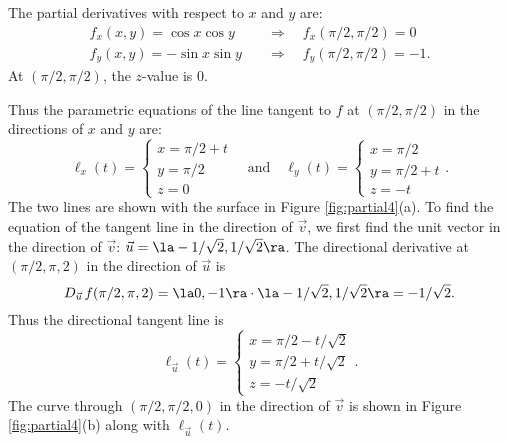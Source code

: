 \clearpage

{The partial derivatives with respect to $x$ and $y$ are:
\begin{align*}
f_x(x,y) = \cos x\cos y\quad &\Rightarrow \quad f_x(\pi/2,\pi/2) = 0\\
f_y(x,y) = -\sin x\sin y\quad&\Rightarrow \quad f_y(\pi/2,\pi/2)=-1.
\end{align*}
At $(\pi/2,\pi/2)$, the $z$-value is 0.

Thus the parametric equations of the line tangent to $f$ at $(\pi/2,\pi/2)$ in the directions of $x$  and $y$ are:
$$\ell_x(t) = \left\{\begin{array}{l} x=\pi/2 + t\\ y=\pi/2 \\z=0 \end{array}\right. \quad \text{and}\quad 
\ell_y(t) = \left\{\begin{array}{l} x=\pi/2 \\ y=\pi/2+t \\z=-t \end{array}\right..$$
The two lines are shown with the surface in Figure \ref{fig:partial4}(a).
To find the equation of the tangent line in the direction of $\vec v$, we first find the unit vector in the direction of $\vec v$: $\vec u = \la -1/\sqrt{2},1/\sqrt{2}\ra$. The directional derivative at $(\pi/2,\pi,2)$ in the direction of $\vec u$ is 
$$D_{\vec u\,}f(\pi/2,\pi,2) = \la 0,-1\ra \cdot \la -1/\sqrt{2},1/\sqrt 2\ra = -1/\sqrt 2.$$
Thus the directional tangent line is 
$$\ell_{\vec u}(t) = \left\{\begin{array}{l} x= \pi/2 -t/\sqrt{2}\\ y = \pi/2 + t/\sqrt{2} \\ z= -t/\sqrt{2}\end{array}\right. .$$
The curve through $(\pi/2,\pi/2,0)$ in the direction of $\vec v$ is shown in Figure \ref{fig:partial4}(b) along with $\ell_{\vec u}(t)$.
}\\

